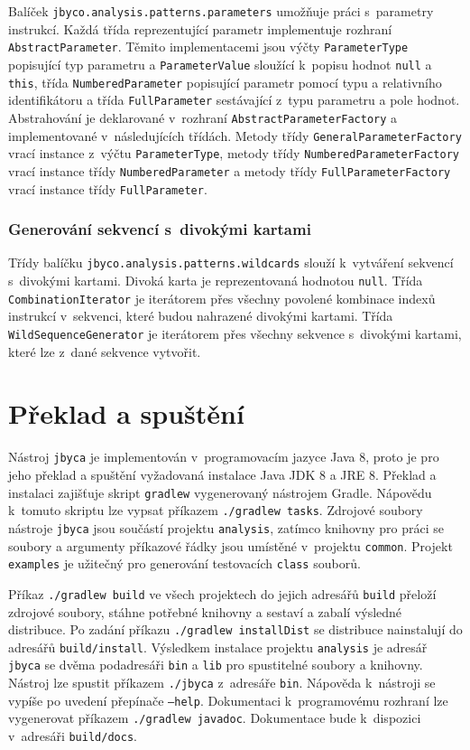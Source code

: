 Balíček \texttt{jbyco.analysis.patterns.parameters} umožňuje práci s~parametry instrukcí. Každá třída reprezentující parametr implementuje rozhraní \texttt{AbstractParameter}. Těmito implementacemi jsou výčty \texttt{ParameterType} popisující typ parametru a \texttt{ParameterValue} sloužící k~popisu hodnot \texttt{null} a \texttt{this}, třída \texttt{NumberedParameter} popisující parametr pomocí typu a relativního identifikátoru a třída \texttt{FullParameter} sestávající z~typu parametru a pole hodnot. Abstrahování je deklarované v~rozhraní \texttt{AbstractParameterFactory} a implementované v~následujících třídách. Metody třídy \texttt{GeneralParameterFactory} vrací instance z~výčtu \texttt{ParameterType}, metody třídy \texttt{NumberedParameterFactory} vrací instance třídy \texttt{NumberedParameter} a metody třídy \texttt{FullParameterFactory} vrací instance třídy \texttt{FullParameter}.

\subsubsection{Generování sekvencí s~divokými kartami}

Třídy balíčku \texttt{jbyco.analysis.patterns.wildcards} slouží k~vytváření sekvencí s~divokými kartami. Divoká karta je reprezentovaná hodnotou \texttt{null}. Třída \texttt{CombinationIterator} je iterátorem přes všechny povolené kombinace indexů instrukcí v~sekvenci, které budou nahrazené divokými kartami. Třída \texttt{WildSequenceGenerator} je iterátorem přes všechny sekvence s~divokými kartami, které lze z~dané sekvence vytvořit.

\section{Překlad a spuštění}\label{Jbyca:Run}

Nástroj \texttt{jbyca} je implementován v~programovacím jazyce Java 8, proto je pro jeho překlad a spuštění vyžadovaná instalace Java JDK 8 a JRE 8.
Překlad a instalaci zajišťuje skript \texttt{gradlew} vygenerovaný nástrojem Gradle. Nápovědu k~tomuto skriptu lze vypsat příkazem \texttt{./gradlew tasks}. 
Zdrojové soubory nástroje \texttt{jbyca} jsou součástí projektu \texttt{analysis}, zatímco knihovny pro práci se soubory a argumenty příkazové řádky jsou umístěné v~projektu \texttt{common}. Projekt \texttt{examples} je užitečný pro generování testovacích \texttt{class} souborů.

Příkaz \texttt{./gradlew build} ve všech projektech do jejich adresářů \texttt{build} přeloží zdrojové soubory, stáhne potřebné knihovny a sestaví a zabalí výsledné distribuce. Po zadání příkazu \texttt{./gradlew installDist} se distribuce nainstalují do adresářů \texttt{build/install}. Výsledkem instalace projektu \texttt{analysis} je adresář \texttt{jbyca} se dvěma podadresáři \texttt{bin} a \texttt{lib} pro spustitelné soubory a knihovny. Nástroj lze spustit příkazem \texttt{./jbyca} z~adresáře \texttt{bin}. Nápověda k~nástroji se vypíše po uvedení přepínače \texttt{---help}. Dokumentaci k~programovému rozhraní lze vygenerovat příkazem \texttt{./gradlew javadoc}. Dokumentace bude k~dispozici v~adresáři \texttt{build/docs}.

